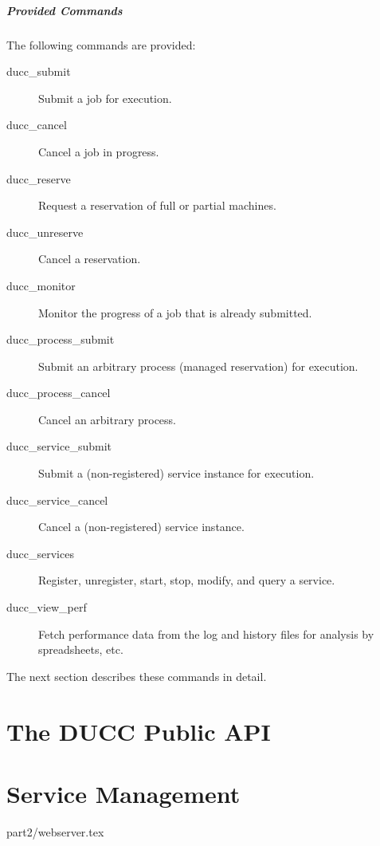     \paragraph{Provided Commands}
    The following commands are provided:
    \begin{description}
    \item[ducc\_submit] Submit a job for execution.
    \item[ducc\_cancel] Cancel a job in progress.
    \item[ducc\_reserve] Request a reservation of full or partial machines.
    \item[ducc\_unreserve] Cancel a reservation.
    \item[ducc\_monitor] Monitor the progress of a job that is already submitted.
    \item[ducc\_process\_submit] Submit an arbitrary process (managed reservation) for execution.
    \item[ducc\_process\_cancel] Cancel an arbitrary process.
    \item[ducc\_service\_submit] Submit a (non-registered) service instance for execution.
    \item[ducc\_service\_cancel] Cancel a (non-registered) service instance.
    \item[ducc\_services] Register, unregister, start, stop, modify, and query a service.
    \item[ducc\_view\_perf] Fetch performance data from the log and history files for analysis
      by spreadsheets, etc.
    \end{description}
    
    The next section describes these commands in detail.

    
    
    
    
    
    
    
    


\ifpdf
\else
{}
\fi

\chapter{The DUCC Public API}
\label{chap:api}


\ifpdf
\else
{}
\fi
\chapter{Service Management}
\label{chap:services}





 {part2/webserver.tex}

